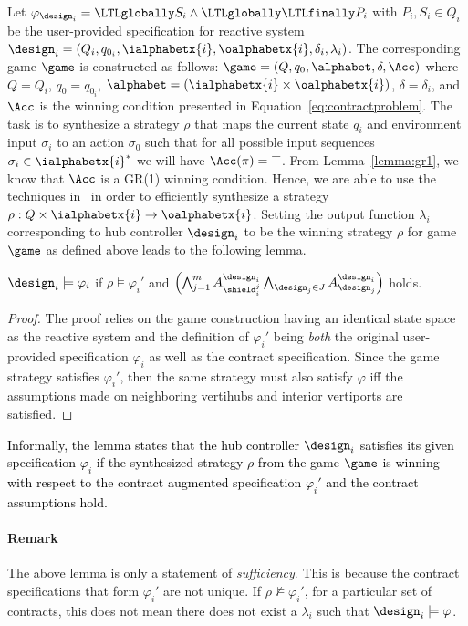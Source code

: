 Let $\varphi_{\design_i} = \LTLglobally S_i \wedge \LTLglobally \LTLfinally P_i$ with $P_i,S_i \in Q_i$ be the user-provided specification for reactive system $\design_i = (Q_i,q_{0_i},\ialphabetx{i},\oalphabetx{i},\delta_i,\lambda_i)$. The corresponding game $\game$ is constructed as follows: $\game = \left(Q,q_0, \alphabet, \delta,\Acc \right)$
where $Q = Q_i$, $q_{0} = q_{0_i}$, $\alphabet = (\ialphabetx{i} \times \oalphabetx{i})$, $\delta = \delta_i$, and $\Acc$ is the winning condition presented in Equation~\eqref{eq:contractproblem}. 
The task is to synthesize a strategy $\rho$ that maps the current state $q_i$ and environment input $\sigma_i$ to an action $\sigma_0$ such that for all possible input sequences $\sigma_i \in \ialphabetx{i}^*$ we will have $\Acc(\pi) = \top$.
From Lemma~\ref{lemma:gr1}, we know that $\Acc$ is a GR(1) winning condition. Hence, we are able to use the techniques in~\cite{bloem2012synthesis} in order to efficiently synthesize a strategy $\rho: Q\times\ialphabetx{i} \rightarrow \oalphabetx{i}$. Setting the output function $\lambda_i$ corresponding to hub controller $\design_i$ to be the winning strategy $\rho$ for game $\game$ as defined above  leads to the following lemma. 
\begin{lemma}
$\design_i \models \varphi_i$ if $\rho \models \varphi_i'$ and $ \left(\bigwedge_{j=1}^m A_{\shield_i^j}^{\design_i} \bigwedge_{\design_j\in J} A_{\design_j}^{\design_i} \right)$ holds. 
\end{lemma}
\begin{proof}
The proof relies on the game construction having an identical state space as the reactive system and the definition of $\varphi_i'$ being \emph{both} the original user-provided specification $\varphi_i$ as well as the contract specification. Since the game strategy satisfies $\varphi_i'$, then the same strategy must also satisfy $\varphi$ iff the assumptions made on neighboring vertihubs and interior vertiports are satisfied.
\end{proof}
\textcolor{black}{Informally, the lemma states that the hub controller $\design_i$ satisfies its given specification $\varphi_i$ if the synthesized strategy $\rho$ from the game $\game$ is winning with respect to the contract augmented specification $\varphi_i'$ and the contract assumptions hold.}
\paragraph*{\textbf{Remark}} The above lemma is only a statement of \emph{sufficiency}. This is because the contract specifications that form $\varphi_i'$ are not unique. If $\rho \nvDash \varphi_i'$, for a particular set of contracts, this does not mean there does not exist a $\lambda_i$ such that $\design_i \models \varphi$.




